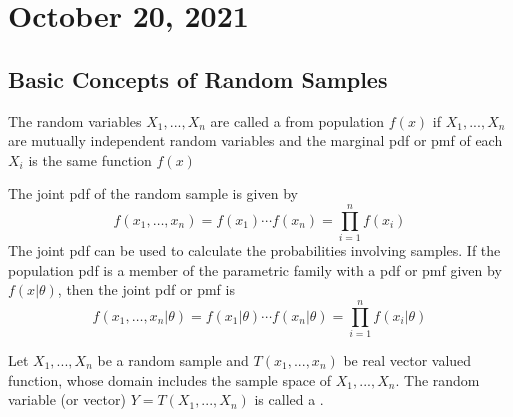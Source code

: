 \section{October 20, 2021}
\subsection{Basic Concepts of Random Samples}
\begin{definition}
The random variables $X_1,...,X_n$ are called a  from population $f(x)$ if $X_1,...,X_n$ are mutually independent random variables and the marginal pdf or pmf of each $X_i$ is the same function $f(x)$
\end{definition}
The joint pdf of the random sample is given by
$$
f(x_1, \dots, x_n) = f(x_1) \cdots f(x_n)
= \prod_{i=1}^{n}f(x_i)
$$
The joint pdf can be used to calculate the probabilities involving samples. If the population pdf is a member of the parametric family with a pdf or pmf given by $f(x|\theta)$, then the joint pdf or pmf is
$$
f(x_1, \dots, x_n| \theta) = f(x_1| \theta) \cdots f(x_n| \theta)
= \prod_{i=1}^{n}f(x_i| \theta)
$$

\begin{definition}
    Let $X_1,...,X_n$ be a random sample and $T(x_1,...,x_n)$ be real vector valued function, whose domain includes the sample space of $X_1,...,X_n$. The random variable (or vector) $Y = T(X_1,...,X_n)$ is called a .
\end{definition}

